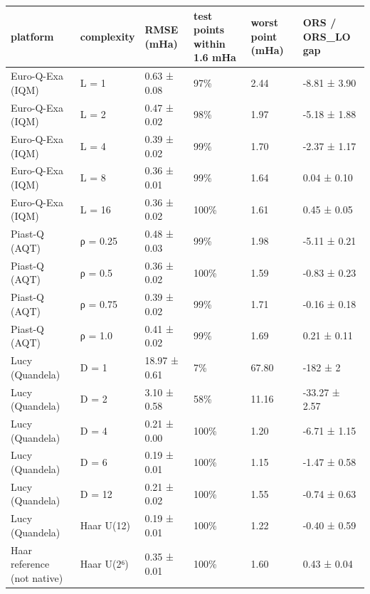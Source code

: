 \begin{tabular}{llllll}
\toprule
platform & complexity & RMSE (mHa) & test points within 1.6 mHa & worst point (mHa) & ORS / ORS\_LO gap \\
\midrule
Euro-Q-Exa (IQM) & L = 1 & 0.63 ± 0.08 & 97\% & 2.44 & -8.81 ± 3.90 \\
Euro-Q-Exa (IQM) & L = 2 & 0.47 ± 0.02 & 98\% & 1.97 & -5.18 ± 1.88 \\
Euro-Q-Exa (IQM) & L = 4 & 0.39 ± 0.02 & 99\% & 1.70 & -2.37 ± 1.17 \\
Euro-Q-Exa (IQM) & L = 8 & 0.36 ± 0.01 & 99\% & 1.64 & 0.04 ± 0.10 \\
Euro-Q-Exa (IQM) & L = 16 & 0.36 ± 0.02 & 100\% & 1.61 & 0.45 ± 0.05 \\
Piast-Q (AQT) & ρ = 0.25 & 0.48 ± 0.03 & 99\% & 1.98 & -5.11 ± 0.21 \\
Piast-Q (AQT) & ρ = 0.5 & 0.36 ± 0.02 & 100\% & 1.59 & -0.83 ± 0.23 \\
Piast-Q (AQT) & ρ = 0.75 & 0.39 ± 0.02 & 99\% & 1.71 & -0.16 ± 0.18 \\
Piast-Q (AQT) & ρ = 1.0 & 0.41 ± 0.02 & 99\% & 1.69 & 0.21 ± 0.11 \\
Lucy (Quandela) & D = 1 & 18.97 ± 0.61 & 7\% & 67.80 & -182 ± 2 \\
Lucy (Quandela) & D = 2 & 3.10 ± 0.58 & 58\% & 11.16 & -33.27 ± 2.57 \\
Lucy (Quandela) & D = 4 & 0.21 ± 0.00 & 100\% & 1.20 & -6.71 ± 1.15 \\
Lucy (Quandela) & D = 6 & 0.19 ± 0.01 & 100\% & 1.15 & -1.47 ± 0.58 \\
Lucy (Quandela) & D = 12 & 0.21 ± 0.02 & 100\% & 1.55 & -0.74 ± 0.63 \\
Lucy (Quandela) & Haar U(12) & 0.19 ± 0.01 & 100\% & 1.22 & -0.40 ± 0.59 \\
Haar reference (not native) & Haar U(2⁶) & 0.35 ± 0.01 & 100\% & 1.60 & 0.43 ± 0.04 \\
\bottomrule
\end{tabular}
